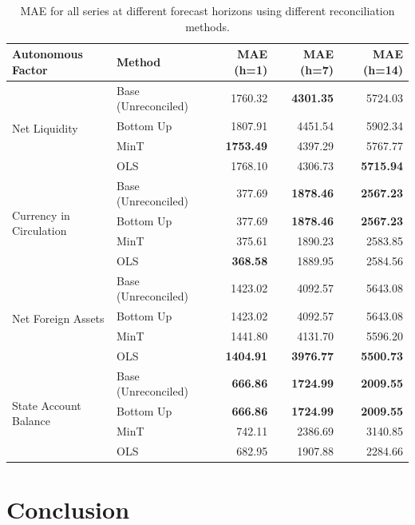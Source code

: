 \documentclass{article}
\begin{document}
\begin{table}[ht]
\centering
\begin{tabular}{l|l|rrr}
  \hline\hline
Autonomous Factor & Method & MAE (h=1) & MAE (h=7) & MAE (h=14) \\ 
  \hline
\multirow{4}{*}{Net Liquidity}&Base (Unreconciled) & 1760.32 & \textbf{4301.35} & 5724.03 \\ 
 & Bottom Up & 1807.91 & 4451.54 & 5902.34 \\ 
 & MinT & \textbf{1753.49} & 4397.29 & 5767.77 \\ 
  &OLS & 1768.10 & 4306.73 & \textbf{5715.94} \\ 
  \hline
\multirow{4}{*}{Currency in Circulation}  &Base (Unreconciled) & 377.69 & \textbf{1878.46} &\textbf{ 2567.23} \\ 
  &Bottom Up & 377.69 & \textbf{1878.46} & \textbf{2567.23 }\\ 
  &MinT & 375.61 & 1890.23 & 2583.85 \\ 
  &OLS & \textbf{368.58} & 1889.95 & 2584.56 \\ 
  \hline
\multirow{4}{*}{Net Foreign Assets}  &Base (Unreconciled) & 1423.02 & 4092.57 & 5643.08 \\ 
  &Bottom Up & 1423.02 & 4092.57 & 5643.08 \\ 
  &MinT & 1441.80 & 4131.70 & 5596.20 \\ 
  &OLS & \textbf{1404.91} & \textbf{3976.77} & \textbf{5500.73} \\ 
  \hline
\multirow{4}{*}{State Account Balance}  &Base (Unreconciled) & \textbf{666.86} &\textbf{ 1724.99} & \textbf{2009.55} \\ 
  &Bottom Up & \textbf{666.86} & \textbf{1724.99 }& \textbf{2009.55} \\ 
  &MinT & 742.11 & 2386.69 & 3140.85 \\ 
  &OLS & 682.95 & 1907.88 & 2284.66 \\ 
   \hline\hline
\end{tabular}
\caption{MAE for all series at different forecast horizons using different reconciliation methods.} 
\label{tab:reco}
\end{table}

\section{Conclusion}\label{sec:conc}
\end{document}
